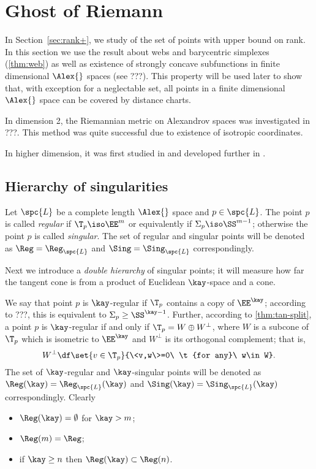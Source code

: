 \chapter{Ghost of Riemann}

In Section~\ref{sec:rank+},
we study of the set of points with upper bound on rank.
In this section we use the result about webs and barycentric simplexes (\ref{thm:web})
as well as existence of strongly concave subfunctions in finite dimensional $\Alex{}$ spaces (see ???).
This property will be used later to show that, with exception for a neglectable set, all points in a finite dimensional $\Alex{}$ space can be covered by distance charts.

In dimension 2, the Riemannian metric on Alexandrov spaces
was investigated in ???.
This method was quite successful due to existence of isotropic coordinates.

In higher dimension, it was first studied in \cite{otsu-shioya} and developed further in \cite{perelman:DC}.


\section{Hierarchy of singularities}

Let $\spc{L}$ be a complete length $\Alex{}$ space and $p\in\spc{L}$.
The point $p$ is called 
\emph{regular}
if $\T_p\iso\EE^m$
or equivalently 
if $\Sigma_p\iso\SS^{m-1}$;
otherwise the point $p$ is called \emph{singular}.
The set of regular and singular points will be denoted as 
$\Reg=\Reg_{\spc{L}}$ 
and $\Sing=\Sing_{\spc{L}}$ correspondingly.

Next we introduce a  \emph{double hierarchy} of singular points;
it will measure how far the tangent cone is from a product of Euclidean $\kay$-space and a cone.

We say that point $p$ is $\kay$-regular if $\T_p$
contains a copy of $\EE^\kay$;
according to ???, this is equivalent to
$\Sigma_p\ge\SS^{\kay-1}$.
Further, 
according to \ref{thm:tan-split},
a point $p$ is $\kay$-regular if and only if
$\T_p=W\oplus W^\bot$, where $W$ is a subcone of $\T_p$ which is isometric to $\EE^\kay$ 
and $W^\bot$ is its orthogonal complement; that is,
\[W^\bot
\df
\set{v\in\T_p}{\<v,w\>=0\ \t{for any}\ w\in W}.\]
The set of $\kay$-regular and $\kay$-singular points will be denoted as $\Reg(\kay)=\Reg_{\spc{L}}(\kay)$
and $\Sing(\kay)=\Sing_{\spc{L}}(\kay)$ correspondingly.
Clearly 
\begin{itemize}
\item $\Reg(\kay)=\emptyset$ for $\kay>m$;
\item $\Reg(m)=\Reg$;
\item if $\kay\ge n$ then $\Reg(\kay)\subset \Reg(n)$.
\end{itemize}
 
